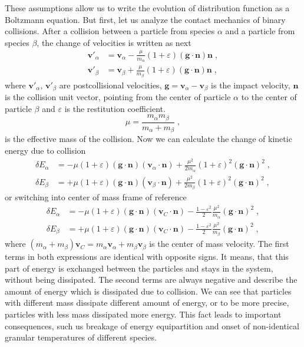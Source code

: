 \documentclass[preprint, aps, pra]{revtex4-1}
\newcommand{\eps}{\varepsilon}
\newcommand{\bv}{{\bm{v}}}
\newcommand{\bg}{{\bm{g}}}
\newcommand{\bn}{{\bm{n}}}
\begin{document}
These assumptions allow us to write the evolution of distribution function as a Boltzmann equation. But first, let us analyze the 
contact mechanics of binary collisions. After a collision between a particle from species $\alpha$ and a particle from species $\beta$,
the change of velocities is written as next
\begin{equation}
  \begin{split}
    \bv'_\alpha &= \bv_\alpha - \frac{\mu}{m_\alpha}(1+\eps)(\bg\cdot\bn)\bn\;,\\
    \bv'_\beta &= \bv_\beta + \frac{\mu}{m_\beta}(1+\eps)(\bg\cdot\bn)\bn\;,
  \end{split}
\end{equation}
where $\bv'_\alpha,\,\bv'_\beta$ are postcollisional velocities, $\bg=\bv_\alpha-\bv_\beta$ is the impact velocity, $\bn$ is the collision
unit vector, pointing from the center of particle $\alpha$ to the center of particle $\beta$ and $\eps$ is the restitution coefficient.
\begin{equation}
  \mu = \frac{m_\alpha m_\beta}{m_\alpha + m_\beta}\;,
\end{equation}
is the effective mass of the collision. Now we can calculate the change of kinetic energy due to collision 
\begin{equation}
  \begin{split}
    \delta E_\alpha &= -\mu(1+\eps)(\bg\cdot\bn)(\bv_\alpha\cdot\bn)+\frac{\mu^2}{2m_\alpha}(1+\eps)^2(\bg\cdot\bn)^2\;,\\
    \delta E_\beta &= +\mu(1+\eps)(\bg\cdot\bn)(\bv_\beta\cdot\bn)+\frac{\mu^2}{2m_\beta}(1+\eps)^2(\bg\cdot\bn)^2\;,
  \end{split}
\end{equation}
or switching into center of mass frame of reference
\begin{equation}
  \begin{split}
    \delta E_\alpha &= -\mu(1+\eps)(\bg\cdot\bn)(\bv_C\cdot\bn)-\frac{1-\eps^2}{2}\frac{\mu^2}{m_\alpha}(\bg\cdot\bn)^2\;,\\
    \delta E_\beta &= +\mu(1+\eps)(\bg\cdot\bn)(\bv_C\cdot\bn)-\frac{1-\eps^2}{2}\frac{\mu^2}{m_\beta}(\bg\cdot\bn)^2\;,
  \end{split}
\end{equation}
where $(m_\alpha+m_\beta)\bv_C=m_\alpha\bv_\alpha+m_\beta\bv_\beta$ is the center of mass velocity. The first terms in both expressions
are identical with opposite signs. It means, that this part of energy is exchanged between the particles and stays in the system, without
being dissipated. The second terms are always negative and describe the amount of energy which is dissipated due to collision. We can see 
that particles with different mass dissipate different amount of energy, or to be more precise, particles with less mass dissipated
more energy. This fact leads to important consequences, such us breakage of energy equipartition and onset of non-identical granular
temperatures of different species. 
\end{document}
